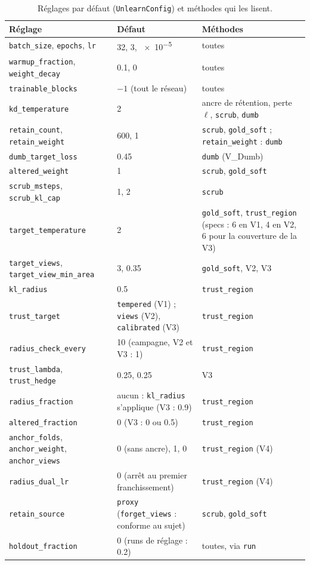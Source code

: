 \documentclass[11pt,a4paper]{article}
\newcommand{\code}[1]{\texttt{#1}}
\begin{document}
\begin{table}[ht]
  \centering\small
  \caption{Réglages par défaut (\code{UnlearnConfig}) et méthodes qui les lisent.}\label{tab:defauts}
  \begin{tabularx}{\linewidth}{@{}>{\raggedright}p{4.3cm}>{\raggedright}p{2.4cm}X@{}}
    \toprule
    Réglage & Défaut & Méthodes\\
    \midrule
    \code{batch\_size}, \code{epochs}, \code{lr} & 32, 3, \num{e-5} & toutes\\
    \code{warmup\_fraction}, \code{weight\_decay} & \num{0.1}, 0 & toutes\\
    \code{trainable\_blocks} & $-1$ (tout le réseau) & toutes\\
    \code{kd\_temperature} & 2 & ancre de rétention, perte $\ell$, \code{scrub}, \code{dumb}\\
    \code{retain\_count}, \code{retain\_weight} & 600, 1 & \code{scrub}, \code{gold\_soft} ;
      \code{retain\_weight} : \code{dumb}\\
    \code{dumb\_target\_loss} & \num{0.45} & \code{dumb} (V\_Dumb)\\
    \code{altered\_weight} & 1 & \code{scrub}, \code{gold\_soft}\\
    \code{scrub\_msteps}, \code{scrub\_kl\_cap} & 1, 2 & \code{scrub}\\
    \code{target\_temperature} & 2 & \code{gold\_soft}, \code{trust\_region} (specs : 6 en V1, 4 en V2,
      6 pour la couverture de la V3)\\
    \code{target\_views}, \code{target\_view\_min\_area} & 3, \num{0.35} & \code{gold\_soft}, V2, V3\\
    \code{kl\_radius} & \num{0.5} & \code{trust\_region}\\
    \code{trust\_target} & \code{tempered} (V1) ; \code{views} (V2), \code{calibrated} (V3)
      & \code{trust\_region}\\
    \code{radius\_check\_every} & 10 (campagne, V2 et V3 : 1) & \code{trust\_region}\\
    \code{trust\_lambda}, \code{trust\_hedge} & \num{0.25}, \num{0.25} & V3\\
    \code{radius\_fraction} & aucun : \code{kl\_radius} s'applique (V3 : \num{0.9}) & \code{trust\_region}\\
    \code{altered\_fraction} & 0 (V3 : 0 ou \num{0.5}) & \code{trust\_region}\\
    \code{anchor\_folds}, \code{anchor\_weight}, \code{anchor\_views} & 0 (sans ancre), 1, 0
      & \code{trust\_region} (V4)\\
    \code{radius\_dual\_lr} & 0 (arrêt au premier franchissement) & \code{trust\_region} (V4)\\
    \code{retain\_source} & \code{proxy} (\code{forget\_views} : conforme au sujet)
      & \code{scrub}, \code{gold\_soft}\\
    \code{holdout\_fraction} & 0 (runs de réglage : \num{0.2}) & toutes, via \code{run}\\
    \bottomrule
  \end{tabularx}
\end{table}
\end{document}
